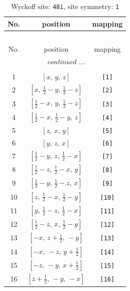 \documentclass[fleqn,8pt]{jsarticle}
\begin{document}
\begin{longtable}{ccc}
\caption{Wyckoff site: {\tt 48i}, site symmetry: {\tt 1}}
 \\
 \hline \hline
No. & position & mapping \\ \hline \endfirsthead

\multicolumn{2}{l}{\tablename\ \thetable{}} \\
 \hline \hline
No. & position & mapping \\ \hline \endhead

 \hline \hline
\multicolumn{2}{r}{\footnotesize\it continued ...} \\ \endfoot

 \hline \hline
\multicolumn{2}{r}{} \\ \endlastfoot

1 & $\left[ x,\, y,\, z \right]$ & {\tt [1]} \\ \hline
2 & $\left[ x,\, \frac{1}{2} - y,\, \frac{1}{2} - z \right]$ & {\tt [2]} \\ \hline
3 & $\left[ \frac{1}{2} - x,\, y,\, \frac{1}{2} - z \right]$ & {\tt [3]} \\ \hline
4 & $\left[ \frac{1}{2} - x,\, \frac{1}{2} - y,\, z \right]$ & {\tt [4]} \\ \hline
5 & $\left[ z,\, x,\, y \right]$ & {\tt [5]} \\ \hline
6 & $\left[ y,\, z,\, x \right]$ & {\tt [6]} \\ \hline
7 & $\left[ \frac{1}{2} - y,\, z,\, \frac{1}{2} - x \right]$ & {\tt [7]} \\ \hline
8 & $\left[ \frac{1}{2} - z,\, \frac{1}{2} - x,\, y \right]$ & {\tt [8]} \\ \hline
9 & $\left[ \frac{1}{2} - y,\, \frac{1}{2} - z,\, x \right]$ & {\tt [9]} \\ \hline
10 & $\left[ z,\, \frac{1}{2} - x,\, \frac{1}{2} - y \right]$ & {\tt [10]} \\ \hline
11 & $\left[ y,\, \frac{1}{2} - z,\, \frac{1}{2} - x \right]$ & {\tt [11]} \\ \hline
12 & $\left[ \frac{1}{2} - z,\, x,\, \frac{1}{2} - y \right]$ & {\tt [12]} \\ \hline
13 & $\left[ - x,\, z + \frac{1}{2},\, - y \right]$ & {\tt [13]} \\ \hline
14 & $\left[ - x,\, - z,\, y + \frac{1}{2} \right]$ & {\tt [14]} \\ \hline
15 & $\left[ - z,\, - y,\, x + \frac{1}{2} \right]$ & {\tt [15]} \\ \hline
16 & $\left[ z + \frac{1}{2},\, - y,\, - x \right]$ & {\tt [16]} \\ \hline

\end{longtable}
\end{document}
